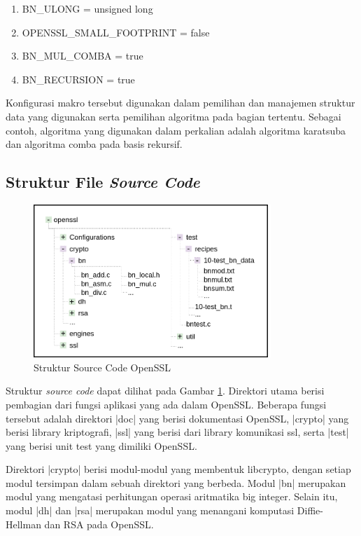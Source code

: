     \begin{enumerate}[label=\roman*.]
      \item BN\_ULONG = unsigned long
      \item OPENSSL\_SMALL\_FOOTPRINT = false
      \item BN\_MUL\_COMBA = true
      \item BN\_RECURSION = true
    \end{enumerate}
    Konfigurasi makro tersebut digunakan dalam pemilihan dan manajemen struktur data yang digunakan serta pemilihan algoritma pada bagian tertentu. Sebagai contoh, algoritma yang digunakan dalam perkalian adalah algoritma karatsuba dan algoritma comba pada basis rekursif.


  \subsection{Struktur File \textit{Source Code}}

    \begin{figure}[h]
      \centering
      \includegraphics[width=0.8\textwidth]{resources/img/ch-4/file-tree.png}
      \caption{Struktur Source Code OpenSSL}
      \label{fig:ossl_file_structure}
    \end{figure}

    Struktur \textit{source code} dapat dilihat pada Gambar \ref{fig:ossl_file_structure}. Direktori utama berisi pembagian dari fungsi aplikasi yang ada dalam OpenSSL. Beberapa fungsi tersebut adalah direktori |doc| yang berisi dokumentasi OpenSSL, |crypto| yang berisi library kriptografi, |ssl| yang berisi dari library komunikasi ssl, serta |test| yang berisi unit test yang dimiliki OpenSSL.

    Direktori |crypto| berisi modul-modul yang membentuk libcrypto, dengan setiap modul tersimpan dalam sebuah direktori yang berbeda. Modul |bn| merupakan modul yang mengatasi perhitungan operasi aritmatika big integer. Selain itu, modul |dh| dan |rsa| merupakan modul yang menangani komputasi Diffie-Hellman dan RSA pada OpenSSL.


